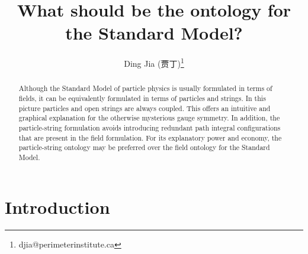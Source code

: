 \documentclass[12pt]{article}
\theoremstyle{definition}
\begin{document}
\begin{CJK*}{UTF8}{gbsn}
\title{What should be the ontology for the Standard Model?}
\author{Ding Jia (贾丁)\thanks{djia@perimeterinstitute.ca}}
\date{}
\maketitle
\end{CJK*}

\begin{abstract}
Although the Standard Model of particle physics is usually formulated in terms of fields, it can be equivalently formulated in terms of particles and strings. In this picture particles and open strings are always coupled. This offers an intuitive and graphical explanation for the otherwise mysterious gauge symmetry. In addition, the particle-string formulation avoids introducing redundant path integral configurations that are present in the field formulation. For its explanatory power and economy, the particle-string ontology may be preferred over the field ontology for the Standard Model.
\end{abstract}






\section{Introduction}
\end{document}
